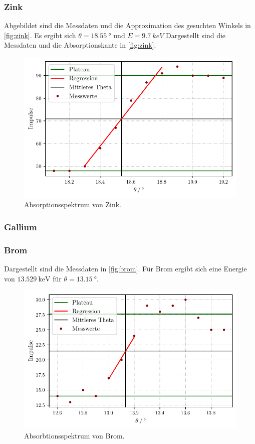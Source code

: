 \subsubsection{Zink}
Abgebildet sind die Messdaten und die Approximation des gesuchten Winkels in \autoref{fig:zink}.
Es ergibt sich $\theta = \qty{18.55}{°}$ und $E = \qty{9.7}{keV}$
Dargestellt sind die Messdaten und die Absorptionskante in \autoref{fig:zink}.
\begin{figure}[H]
  \centering
  \caption{Absorptionsspektrum von Zink.}
  \label{fig:zink}
  \includegraphics[width=0.5 \linewidth]{build/zink.pdf}
\end{figure}

\subsubsection{Gallium}

\subsubsection{Brom}
Dargestellt sind die Messdaten in \autoref{fig:brom}.
Für Brom ergibt sich eine Energie von $\qty{13.529}{\keV}$ für $\theta = \qty{13.15}{°}$.

\begin{figure} [H]
  \centering
  \caption{Absorbtionsspektrum von Brom.}
  \label{fig:brom}
  \includegraphics[width=0.5 \linewidth]{build/brom.pdf}
\end{figure}

